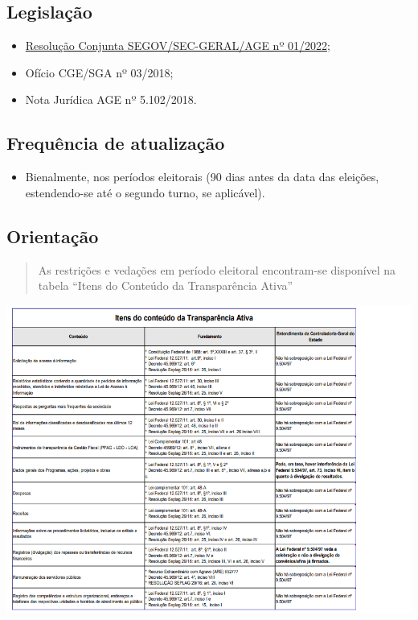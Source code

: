\documentclass[
]{book}
\providecommand{\tightlist}{%
  \setlength{\itemsep}{0pt}\setlength{\parskip}{0pt}}
\begin{document}
\hypertarget{legislauxe7uxe3o-14}{%
\subsection{Legislação}\label{legislauxe7uxe3o-14}}

\begin{itemize}
\tightlist
\item
  \href{http://pesquisalegislativa.mg.gov.br/LegislacaoCompleta.aspx?cod=198806\&marc=}{Resolução Conjunta SEGOV/SEC-GERAL/AGE nº 01/2022};
\item
  Ofício CGE/SGA nº 03/2018;
\item
  Nota Jurídica AGE nº 5.102/2018.
\end{itemize}

\hypertarget{frequuxeancia-de-atualizauxe7uxe3o-13}{%
\subsection{Frequência de atualização}\label{frequuxeancia-de-atualizauxe7uxe3o-13}}

\begin{itemize}
\tightlist
\item
  Bienalmente, nos períodos eleitorais (90 dias antes da data das eleições, estendendo-se até o segundo turno, se aplicável).
\end{itemize}

\hypertarget{orientauxe7uxe3o}{%
\subsection{Orientação}\label{orientauxe7uxe3o}}

\begin{quote}
As restrições e vedações em período eleitoral encontram-se disponível na tabela ``Itens do Conteúdo da Transparência Ativa''
\end{quote}

\includegraphics{static/tabela-itens-conteudo-transparencia-ativa.png}
\end{document}
